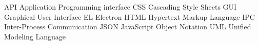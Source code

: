 
   {API}      {Application Programming interface}
    {CSS}       {Cascading Style Sheets}
    {GUI}       {Graphical User Interface}
     {EL}        {Electron}
   {HTML}      {Hypertext Markup Language}
   {IPC}      {Inter-Process Communication}
   {JSON}      {JavaScript Object Notation}
   {UML}      {Unified Modeling Language}